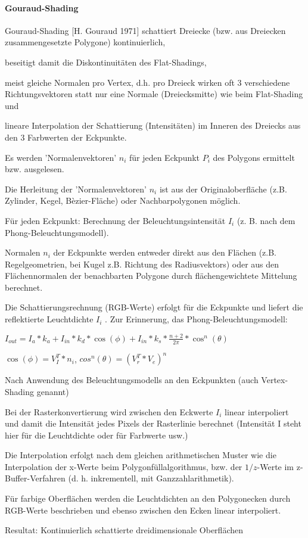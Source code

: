 \documentclass[landscape]{article}
\begin{document}
\begin{multicols}{3}
  \paragraph{Gouraud-Shading}
  \begin{itemize*}
    \item Gouraud-Shading [H. Gouraud 1971] schattiert Dreiecke (bzw. aus Dreiecken zusammengesetzte Polygone) kontinuierlich,
    \item beseitigt damit die Diskontinuitäten des Flat-Shadings,
    \item meist gleiche Normalen pro Vertex, d.h. pro Dreieck wirken oft 3 verschiedene Richtungsvektoren statt nur eine Normale (Dreiecksmitte) wie beim Flat-Shading und
    \item lineare Interpolation der Schattierung (Intensitäten) im Inneren des Dreiecks aus den 3 Farbwerten der Eckpunkte.
    \item Es werden 'Normalenvektoren' $n_i$ für jeden Eckpunkt $P_i$ des Polygons ermittelt bzw. ausgelesen.
    \item Die Herleitung der 'Normalenvektoren' $n_i$ ist aus der Originaloberfläche (z.B. Zylinder, Kegel, Bèzier-Fläche) oder Nachbarpolygonen möglich.
    \item Für jeden Eckpunkt: Berechnung der Beleuchtungsintensität $I_i$ (z. B. nach dem Phong-Beleuchtungsmodell).
    \item Normalen $n_i$ der Eckpunkte werden entweder direkt aus den Flächen (z.B. Regelgeometrien, bei Kugel z.B. Richtung des Radiusvektors) oder aus den Flächennormalen der benachbarten Polygone durch flächengewichtete Mittelung berechnet.
    \item Die Schattierungsrechnung (RGB-Werte) erfolgt für die Eckpunkte und liefert die reflektierte Leuchtdichte $I_i$ . Zur Erinnerung, das Phong-Beleuchtungsmodell:
    \item $I_{out}=I_a*k_a+I_{in}*k_d*\cos(\phi)+I_{in}*k_s*\frac{n+2}{2\pi}*\cos^n(\theta)$
    \item $\cos(\phi)=V^T_I*n_i$, $cos^n(\theta)=(V^T_r * V_e)^n$
    \item Nach Anwendung des Beleuchtungsmodells an den Eckpunkten (auch Vertex-Shading genannt)
    \item Bei der Rasterkonvertierung wird zwischen den Eckwerte $I_i$ linear interpoliert und damit die Intensität jedes Pixels der Rasterlinie berechnet (Intensität I steht hier für die Leuchtdichte oder für Farbwerte usw.)
    \item Die Interpolation erfolgt nach dem gleichen arithmetischen Muster wie die Interpolation der x-Werte beim Polygonfüllalgorithmus, bzw. der $1/z$-Werte im z-Buffer-Verfahren (d. h. inkrementell, mit Ganzzahlarithmetik).
    \item Für farbige Oberflächen werden die Leuchtdichten an den Polygonecken durch RGB-Werte beschrieben und ebenso zwischen den Ecken linear interpoliert.
    \item Resultat: Kontinuierlich schattierte dreidimensionale Oberflächen
  \end{itemize*}
  

\end{multicols}
\end{document}
